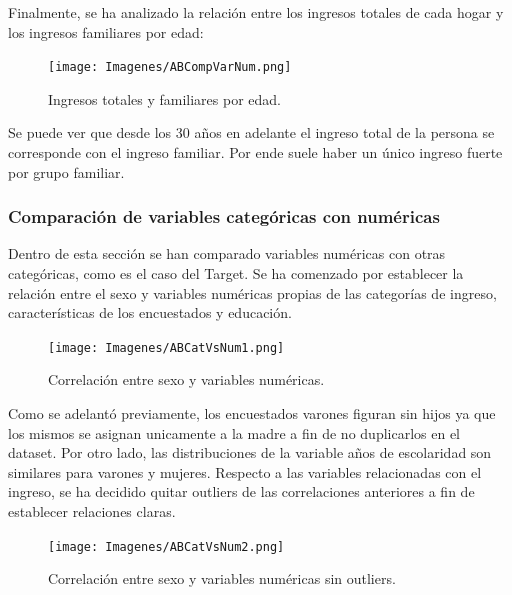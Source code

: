 \documentclass[a4paper]{article}
\begin{document}
 \vspace{1cm}
 
            Finalmente, se ha analizado la relación entre los ingresos totales de cada hogar y los ingresos familiares por edad:
            \begin{figure}[H]
                \centering
                \texttt{[image: Imagenes/ABCompVarNum.png]}
                \caption{Ingresos totales y familiares por edad.}
                \label{AB Income and age relationship}
            \end{figure}
 
            Se puede ver que desde los 30 años en adelante el ingreso total de la persona se corresponde con el ingreso familiar. Por ende suele haber un único ingreso fuerte por grupo familiar.
 
        \subsubsection{Comparación de variables categóricas con numéricas}
 
            Dentro de esta sección se han comparado variables numéricas con otras categóricas, como es el caso del Target. Se ha comenzado por establecer la relación entre el sexo y variables numéricas propias de las categorías de ingreso, características de los encuestados y educación.
 
            \begin{figure}[H]
                \centering
                \texttt{[image: Imagenes/ABCatVsNum1.png]}
                \caption{Correlación entre sexo y variables numéricas.}
                \label{AB genre and numeric variables}
            \end{figure}
 
            Como se adelantó previamente, los encuestados varones figuran sin hijos ya que los mismos se asignan unicamente a la madre a fin de no duplicarlos en el dataset. Por otro lado, las distribuciones de la variable años de escolaridad son similares para varones y mujeres.
            Respecto a las variables relacionadas con el ingreso, se ha decidido quitar outliers de las correlaciones anteriores a fin de establecer relaciones claras.
 
            \begin{figure}[H]
                \centering
                \texttt{[image: Imagenes/ABCatVsNum2.png]}
                \caption{Correlación entre sexo y variables numéricas sin outliers.}
                \label{AB genre and numeric variables without outliers}
            \end{figure}
 
\end{document}
